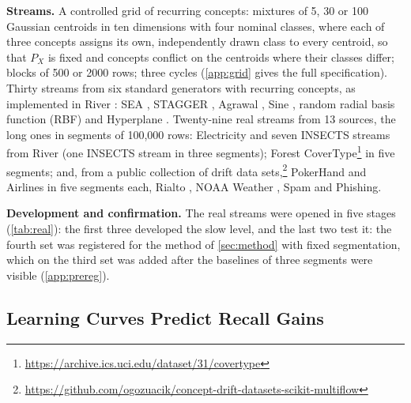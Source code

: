 \documentclass[11pt]{article}
\theoremstyle{plain}
\theoremstyle{definition}
\theoremstyle{remark}
\begin{document}
\textbf{Streams.} A controlled grid of recurring concepts: mixtures of 5, 30 or 100 Gaussian
centroids in ten dimensions with four nominal classes, where each of three concepts assigns its own, independently
drawn class to every centroid, so that $P_X$ is fixed and concepts conflict on the centroids where their classes
differ; blocks of 500 or 2000 rows; three cycles (\cref{app:grid} gives the full specification). Thirty streams from six standard generators with recurring concepts, as implemented in River \citep{montiel2021river}:
SEA \citep{street2001sea}, STAGGER \citep{schlimmer1986stagger}, Agrawal \citep{agrawal1993database}, Sine
\citep{gama2004ddm}, random radial basis function (RBF) \citep{bifet2009new} and Hyperplane \citep{hulten2001mining}. Twenty-nine real streams from 13 sources, the long ones in segments
of 100{,}000 rows: Electricity and seven INSECTS streams \citep{souza2020insects} from River \citep{montiel2021river} (one INSECTS stream in
three segments); Forest CoverType\footnote{\url{https://archive.ics.uci.edu/dataset/31/covertype}} in five segments; and,
from a public collection of drift data sets,\footnote{\url{https://github.com/ogozuacik/concept-drift-datasets-scikit-multiflow}}
PokerHand and Airlines in five segments each, Rialto \citep{losing2016knn}, NOAA Weather \citep{elwell2011nse}, Spam
\citep{katakis2010tracking} and Phishing.

\textbf{Development and confirmation.} The real streams were opened in five stages (\cref{tab:real}): the first
three developed the slow level, and the last two test it: the fourth set was registered for the method of
\cref{sec:method} with fixed segmentation, which on the third set was added after the baselines of three segments were visible
(\cref{app:prereg}).


\subsection{Learning Curves Predict Recall Gains}
\label{sec:rq1}
\end{document}
